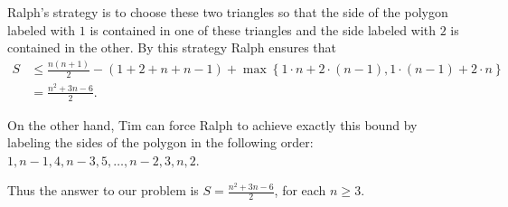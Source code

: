 \documentclass[a4paper,12pt]{article}
\begin{document}
\begin{enumerate}
	Ralph’s strategy is to choose these two triangles so that the side of the polygon labeled with $1$ is contained in one of these triangles and the side labeled with $2$ is contained in the other. By this strategy Ralph ensures that \begin{align*} S &\leq \frac{n(n+1)}{2} -(1+2+n+n-1) +\max\left\{1\cdot n +2\cdot (n-1), 1\cdot (n-1) +2\cdot n\right\} \\ &= \frac{n^2+3n-6}{2}.\end{align*}
	
	On the other hand, Tim can force Ralph to achieve exactly this bound by labeling the sides of the polygon in the following order: $1, n-1, 4, n-3, 5, \dotsc, n-2, 3, n, 2$.
	
	Thus the answer to our problem is $S = \frac{n^2+3n-6}{2}$, for each $n\geq 3$.

\end{enumerate}
\end{document}
